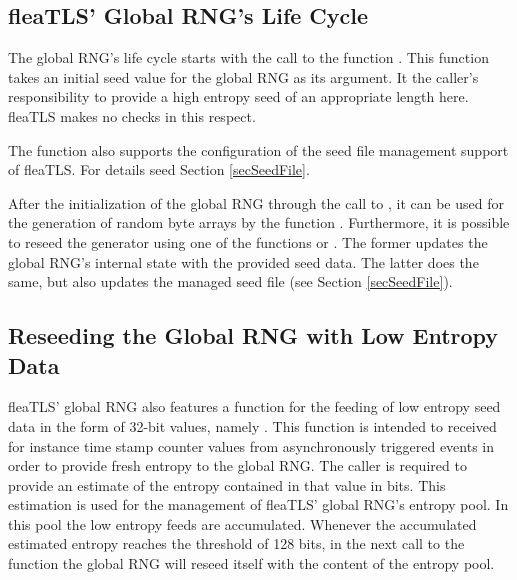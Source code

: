\documentclass[a4paper,11pt]{scrartcl}
\begin{document}
\subsection{fleaTLS' Global RNG's Life Cycle}
\label{secRngLifeCycle}
The global RNG's life cycle starts with the call to the function
. This function takes an initial seed value for
the global RNG as its argument. It the caller's responsibility to provide a high
entropy seed of an appropriate length here. fleaTLS makes no checks in this
respect. 

The function \funcLibInit also supports the configuration of the seed file
management support of fleaTLS. For details seed Section \ref{secSeedFile}.


After the initialization of the global RNG through the call to
, it can be used for the generation of random
byte arrays by the function . Furthermore,
it is possible to reseed the generator using one of the functions
 or 
. The former updates the global
RNG's internal state with the provided seed data. The latter does the same, but
also updates the managed seed file (see Section \ref{secSeedFile}).

\subsection{Reseeding the Global RNG with Low Entropy Data}
\label{secLowEntropyReseed}
fleaTLS' global RNG also features a function for the feeding of low entropy seed
data in the form of 32-bit values, namely
. This function is
intended to received for instance time stamp counter values from asynchronously
triggered events in order to provide fresh entropy to the global RNG. The caller
is required to provide an estimate of the entropy contained in that value in
bits. This estimation is used for the management of fleaTLS' global RNG's
entropy pool. In this pool the low entropy feeds are accumulated. Whenever the
accumulated estimated entropy reaches the threshold of 128 bits, in the next
call to the function  the global RNG will
reseed itself with the content of the entropy pool. 
\end{document}
